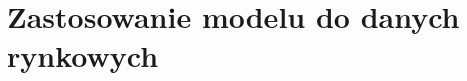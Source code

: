 \chapter{Zastosowanie modelu do danych rynkowych}
\label{ch:zastosowanie_do_danych}
\mgrclosechapter